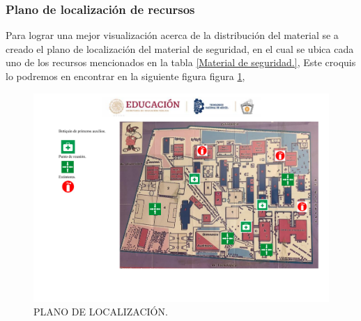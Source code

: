     \subsubsection{Plano de localización de recursos}
    Para lograr una mejor visualización acerca de la distribución del material se a creado el plano de localización del material de seguridad, en el cual se ubica cada uno de los recursos mencionados en la tabla  \ref{Material de seguridad.}, Este croquis lo podremos en encontrar en la siguiente figura figura \ref{Localizacion del material}, 
    \begin{figure}
        \centering
    \includegraphics[trim = {0mm 0mm 0mm 0mm},clip,scale=0.3]{24/Img/planodeLocalizacion.pdf}
        \caption{PLANO DE LOCALIZACIÓN.}
        \label{Localizacion del material}
    \end{figure}
